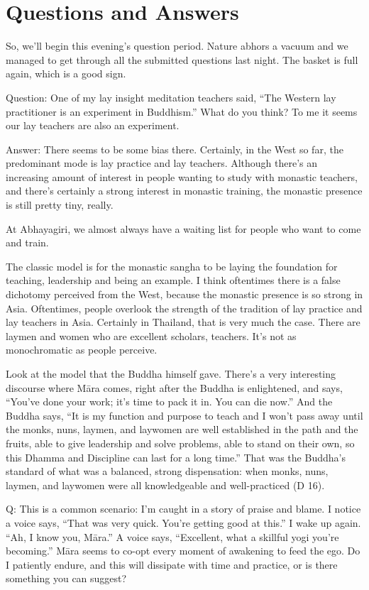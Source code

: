 \chapter{Questions and Answers}

So, we’ll begin this evening’s question period. Nature abhors a vacuum
and we managed to get through all the submitted questions last night.
The basket is full again, which is a good sign.

\qaspace
Question: One of my lay insight meditation teachers said, “The Western
lay practitioner is an experiment in Buddhism.” What do you think? To me
it seems our lay teachers are also an experiment.

\qaspace
Answer: There seems to be some bias there. Certainly, in the West so
far, the predominant mode is lay practice and lay teachers. Although
there’s an increasing amount of interest in people wanting to study with
monastic teachers, and there’s certainly a strong interest in monastic
training, the monastic presence is still pretty tiny, really.

At Abhayagiri, we almost always have a waiting list for people who want
to come and train.

The classic model is for the monastic sangha to be laying the foundation
for teaching, leadership and being an example. I think oftentimes there
is a false dichotomy perceived from the West, because the monastic
presence is so strong in Asia. Oftentimes, people overlook the strength
of the tradition of lay practice and lay teachers in Asia. Certainly in
Thailand, that is very much the case. There are laymen and women who are
excellent scholars, teachers. It’s not as monochromatic as people
perceive.

Look at the model that the Buddha himself gave. There’s a very
interesting discourse where Māra comes, right after the Buddha is
enlightened, and says, “You’ve done your work; it’s time to pack it in.
You can die now.” And the Buddha says, “It is my function and purpose to
teach and I won’t pass away until the monks, nuns, laymen, and laywomen
are well established in the path and the fruits, able to give leadership
and solve problems, able to stand on their own, so this Dhamma and
Discipline can last for a long time.” That was the Buddha’s standard of
what was a balanced, strong dispensation: when monks, nuns, laymen, and
laywomen were all knowledgeable and well-practiced (D 16).

\qaspace
Q: This is a common scenario: I’m caught in a story of praise and blame.
I notice a voice says, “That was very quick. You’re getting good at
this.” I wake up again. “Ah, I know you, Māra.” A voice says,
“Excellent, what a skillful yogi you’re becoming.” Māra seems to co-opt
every moment of awakening to feed the ego. Do I patiently endure, and
this will dissipate with time and practice, or is there something you
can suggest?


